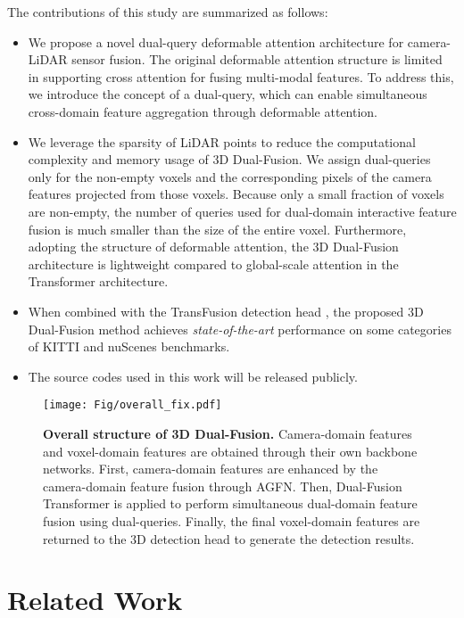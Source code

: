 \documentclass[lettersize,journal]{IEEEtran}
\begin{document}
 The contributions of this study are summarized as follows:
\begin{itemize}
    \item We propose a novel dual-query deformable attention architecture for camera-LiDAR sensor fusion. The original deformable attention structure is limited in supporting cross attention for fusing multi-modal features. To address this, we introduce the concept of a dual-query, which can enable simultaneous cross-domain feature aggregation through deformable attention.
    
    
\item We leverage the sparsity of LiDAR points to reduce the computational complexity and memory usage of 3D Dual-Fusion. We assign dual-queries only for the non-empty voxels and the corresponding pixels of the camera features projected from those voxels. Because only a small fraction of voxels are non-empty, the number of queries used for dual-domain interactive feature fusion is much smaller than the size of the entire voxel.  Furthermore, adopting the structure of deformable attention, the 3D Dual-Fusion architecture is lightweight compared to global-scale attention in the Transformer architecture. 
     \item When combined with the TransFusion detection head \cite{transfusion}, the proposed 3D Dual-Fusion method achieves  {\it state-of-the-art} performance  on some categories of KITTI and nuScenes benchmarks.
    
\item The source codes used in this work will be released publicly. 
\end{itemize}

\begin{figure*}[t]
	\centering
        \centerline{\texttt{[image: Fig/overall\_fix.pdf]}}
    	\caption {\textbf{Overall structure of 3D Dual-Fusion.} Camera-domain features and voxel-domain features are obtained through their own backbone networks. First, camera-domain features are enhanced by the camera-domain feature fusion through AGFN. Then, Dual-Fusion Transformer is applied to perform simultaneous dual-domain feature fusion using dual-queries. Finally, the final voxel-domain features are returned to the 3D detection head to generate the detection results.}
	\label{overall}
\end{figure*}

\section{Related Work}
\label{sec:Related work}
\end{document}
